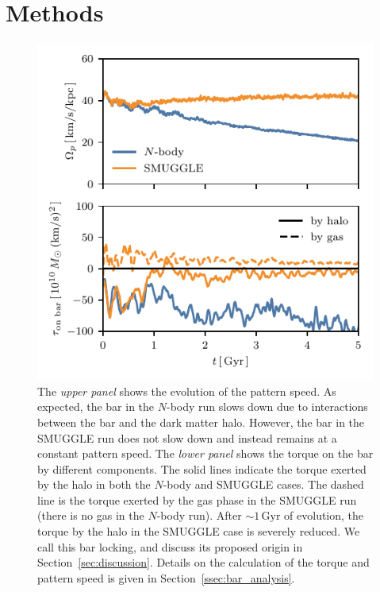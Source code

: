 \documentclass[twocolumn,linenumbers,trackchanges]{aastex631}
\newcommand{\Nbody}{$N$-body}
\newcommand{\SMUGGLE}{SMUGGLE}
\begin{document}

\section{Methods}
\label{sec:methods}
\begin{figure}
    \centering
    \includegraphics[width=\columnwidth]{fig/ps_torque.pdf}
    \caption{The \textit{upper panel} shows the evolution of the pattern speed.
    As expected, the bar in the \Nbody{} run slows down due to interactions
    between the bar and the dark matter halo. However, the bar in the \SMUGGLE{}
    run does not slow down and instead remains at a constant pattern speed. The
    \textit{lower panel} shows the torque on the bar by different components.
    The solid lines indicate the torque exerted by the halo in both the \Nbody{}
    and \SMUGGLE{} cases. The dashed line is the torque exerted by the gas phase
    in the \SMUGGLE{} run (there is no gas in the \Nbody{} run). After
    $\sim1\,\textrm{Gyr}$ of evolution, the torque by the halo in the \SMUGGLE{}
    case is severely reduced. We call this bar locking, and discuss its proposed
    origin in Section~\ref{sec:discussion}. Details on the calculation of the
    torque and pattern speed is given in
    Section~\ref{ssec:bar_analysis}.}\label{fig:prop}
\end{figure}
\end{document}
